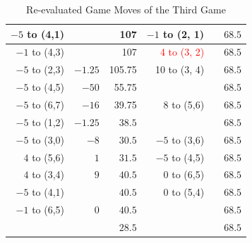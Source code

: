 \begin{appendices}
\begin{table}[H]
\begin{tabular}{rrrrrr}
         $-5$ to (4,1) &      &  107    &   $-1$ to (2, 1) &      &  $68.5$    \\ \hline
         $-1$ to (4,3) &      &  107    &   \textcolor{red}{4 to (3, 2)} &      &  $68.5$    \\ \hline
         $-5$ to (2,3) & $-1.25$      &  105.75    &   10 to (3, 4) &      &  $68.5$    \\ \hline
         $-5$ to (4,5) & $-50$      &  55.75    &                &      &  $68.5$    \\ \hline
         $-5$ to (6,7) & $-16$      &  39.75    & 8 to (5,6)     &      &  $68.5$    \\ \hline
         $-5$ to (1,2) & $-1.25$      &  $38.5$  &                &      &  $68.5$    \\ \hline
         $-5$ to (3,0) & $-8$      &  $30.5$  & $-5$ to (3,6)     &      &  $68.5$    \\ \hline
         $4$ to (5,6) & $1$      &  $31.5$  & $-5$ to (4,5)       &      &  $68.5$    \\ \hline
         $4$ to (3,4) & $9$      &  $40.5$ & $0$ to (6,5)       &      &  $68.5$    \\ \hline
         $-5$ to (4,1) &         &  $40.5$ & $0$ to (5,4)       &      &  $68.5$    \\ \hline
         $-1$ to (6,5) & $0$     &  $40.5$ &                    &      &  $68.5$    \\ \hline \hline
                       &         &  $28.5$  &                    &      &  $68.5$    \\ \hline \hline
    \end{tabular}
    \caption{Re-evaluated Game Moves of the Third Game}
    \label{tab:alt-third-game}
\end{table}



\end{appendices}
